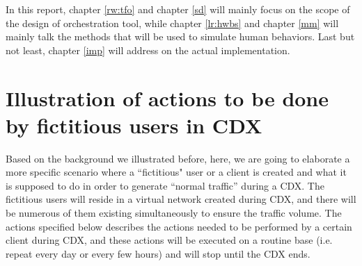 \documentclass[12pt]{report}
\begin{document}
In this report, chapter \ref{rw:tfo} and chapter \ref{sd} will mainly focus on the scope of the design of orchestration tool, while chapter \ref{lr:hwbs} and chapter \ref{mm} will mainly talk the methods that will be used to simulate human behaviors. Last but not least, chapter \ref{imp} will address on the actual implementation.

\section{Illustration of actions to be done by fictitious users in CDX} \label{senario}

Based on the background we illustrated before, here, we are going to elaborate a more specific scenario where a ``fictitious" user or a client is created and what it is supposed to do in order to generate “normal traffic” during a CDX. The fictitious users will reside in a virtual network created during CDX, and there will be numerous of them existing simultaneously to ensure the traffic volume. The actions specified below describes the actions needed to be performed by a certain client during CDX, and these actions will be executed on a routine base (i.e. repeat every day or every few hours) and will stop until the CDX ends.\\
\end{document}
